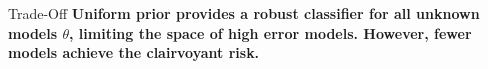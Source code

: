 \documentclass[aspectratio=169]{beamer}
\begin{document}
\begin{frame}
\begin{columns}[c]
\begin{column}{.5\linewidth}
\end{column}

\end{columns}

\vspace{-0.5em}
\begin{block}{Trade-Off}
\textbf{Uniform prior provides a robust classifier for all unknown models $\theta$, limiting the space of high error models. However, fewer models achieve the clairvoyant risk.}
\end{block}


\end{frame}
\end{document}
